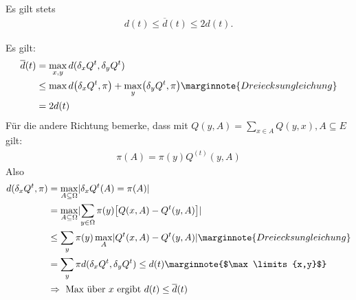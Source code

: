 \begin{lemma}
	Es gilt stets
	\begin{align}
		d(t) \leq \overline{d}(t) \leq 2d(t).
	\end{align}
\end{lemma}
\begin{beweis}
	Es gilt: 
	\begin{align}
		\overline{d}(t) &= \max\limits_{x,y} d(\delta_x Q^t, \delta_y Q^t) \\
			&\leq \max d\enb{\delta_x Q^t, \pi} + \max\limits_y \enb{\delta_y Q^t,\pi} \marginnote{Dreiecksungleichung} \\
			&= 2d(t)
	\end{align}
	Für die andere Richtung bemerke, dass mit $Q(y,A) = \sum\limits_{x \in A} Q(y,x), A \subseteq E$ gilt:
	\begin{align}
		\pi(A) = \pi(y) Q^{(t)}(y,A)
	\end{align}
	Also
	\begin{align}
		d(\delta_x Q^t,\pi) &= \max\limits_{A \subseteq \Omega} \abs{\delta_x Q^t (A) = \pi (A)} \\
			&= \max\limits_{A \subseteq \Omega} \abs{\sum\limits_{y \in \Omega} \pi(y) \benb{Q(x,A) - Q^t(y,A)} } \\
			&\leq \sum\limits_{y} \pi(y) \max\limits_{A} \abs{Q^t\enb{x,A} - Q^t(y,A) } \marginnote{Dreiecksungleichung} \\
			&= \sum\limits_{y}\pi d(\delta_x Q^t, \delta_y Q^t) \leq d(t) \marginnote{$\max\limits{x,y}$} \\
			&\Rightarrow \text{ Max über $x$ ergibt } d(t) \leq \overline{d}(t)
	\end{align}
\end{beweis}

